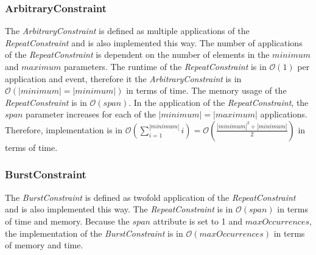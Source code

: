 \subsubsection{ArbitraryConstraint}
	The \emph{ArbitraryConstraint} is defined as multiple applications of the \emph{RepeatConstraint} and is also implemented this way. The number of applications of the \emph{RepeatConstraint} is dependent on the number of elements in the $minimum$ and $maximum$ parameters. The runtime of the \emph{RepeatConstraint} is in $\mathcal{O}(1)$ per application and event, therefore it the \emph{ArbitraryConstraint} is in $\mathcal{O}(|minimum|=|minimum|)$ in terms of time. The memory usage of the \emph{RepeatConstraint} is in $\mathcal{O}(span)$. In the application of the \emph{RepeatConstraint}, the $span$ parameter increases for each of the $|minimum| = |maximum|$ applications. Therefore, implementation is in $\mathcal{O}(\sum_{i=1}^{|minimum|}i)=\mathcal{O}(\frac{|minimum|^2+|minimum|}{2})$ in terms of time.

\subsubsection{BurstConstraint}
	The \emph{BurstConstraint} is defined as twofold application of the \emph{RepeatConstraint} and is also implemented this way. The \emph{RepeatConstraint} is in $\mathcal{O}(span)$ in terms of time and memory. Because the $span$ attribute is set to 1 and $maxOccurrences$, the implementation of the \emph{BurstConstraint} is in $\mathcal{O}(maxOccurrences)$ in terms of memory and time.

